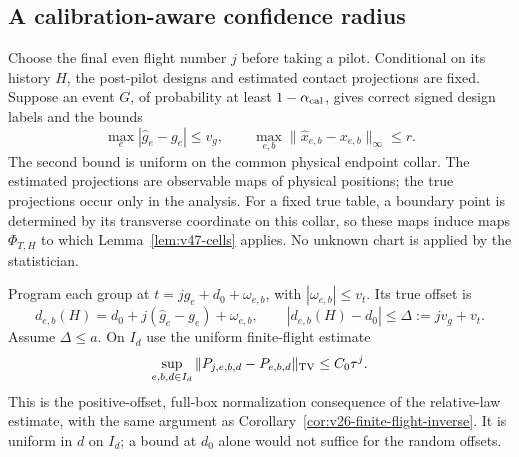 \subsection{A calibration-aware confidence radius}

Choose the final even flight number $j$ before taking a pilot.  Conditional
on its history $H$, the post-pilot designs and estimated contact projections
are fixed.  Suppose an event $G$, of probability at least $1-\alpha_{\rm cal}$,
gives correct signed design labels and the bounds
\begin{equation}\label{eq:v47-pilot-premises}
 \max_e|\widehat g_e-g_e|\le v_g,\qquad
 \max_{e,b}\|\widehat x_{e,b}-x_{e,b}\|_\infty\le r.
\end{equation}
The second bound is uniform on the common physical endpoint collar.
The estimated projections are observable maps of physical positions; the
true projections occur only in the analysis.  For a fixed true table, a
boundary point is determined by its transverse coordinate on this collar,
so these maps induce maps $\Phi_{T,H}$ to which
Lemma~\ref{lem:v47-cells} applies.  No unknown chart is applied by the
statistician.

Program each group at $t=j\widehat g_e+d_0+\omega_{e,b}$, with
$|\omega_{e,b}|\le v_t$.  Its true offset is
\begin{equation}\label{eq:v47-offset-amplification}
 d_{e,b}(H)=d_0+j(\widehat g_e-g_e)+\omega_{e,b},\qquad
 |d_{e,b}(H)-d_0|\le\Delta:=jv_g+v_t.
\end{equation}
Assume $\Delta\le a$.  On $I_d$ use the uniform finite-flight estimate
\begin{equation}\label{eq:v47-uniform-flight}
 \sup_{e,b,d\in I_d}\|P_{j,e,b,d}-P_{e,b,d}\|_{\rm TV}
 \le C_0\tau^j.
\end{equation}
This is the positive-offset, full-box normalization consequence of the
relative-law estimate, with the same argument as
Corollary~\ref{cor:v26-finite-flight-inverse}.  It is uniform in $d$ on
$I_d$; a bound at $d_0$ alone would not suffice for the random offsets.

